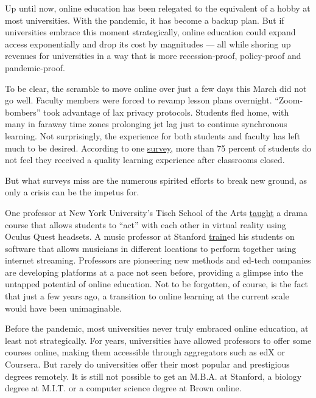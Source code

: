 Up until now, online education has been relegated to the equivalent of a
hobby at most universities. With the pandemic, it has become a backup
plan. But if universities embrace this moment strategically, online
education could expand access exponentially and drop its cost by
magnitudes --- all while shoring up revenues for universities in a way
that is more recession-proof, policy-proof and pandemic-proof.

To be clear, the scramble to move online over just a few days this March
did not go well. Faculty members were forced to revamp lesson plans
overnight. ``Zoom-bombers'' took advantage of lax privacy protocols.
Students fled home, with many in faraway time zones prolonging jet lag
just to continue synchronous learning. Not surprisingly, the experience
for both students and faculty has left much to be desired. According to
one
\href{https://oneclass.com/blog/featured/177356-7525-of-college-students-unhappy-with-quality-of-elearning-during-covid-19.en.html}{survey},
more than 75 percent of students do not feel they received a quality
learning experience after classrooms closed.

But what surveys miss are the numerous spirited efforts to break new
ground, as only a crisis can be the impetus for.

One professor at New York University's Tisch School of the Arts
\href{https://www.ny1.com/nyc/all-boroughs/coronavirus-blog/2020/05/06/nyu-vr-drama-classes}{taught}
a drama course that allows students to ``act'' with each other in
virtual reality using Oculus Quest headsets. A music professor at
Stanford
\href{https://news.stanford.edu/2020/04/06/stanford-faculty-students-connect-digital-classrooms/}{train}ed
his students on software that allows musicians in different locations to
perform together using internet streaming. Professors are pioneering new
methods and ed-tech companies are developing platforms at a pace not
seen before, providing a glimpse into the untapped potential of online
education. Not to be forgotten, of course, is the fact that just a few
years ago, a transition to online learning at the current scale would
have been unimaginable.

Before the pandemic, most universities never truly embraced online
education, at least not strategically. For years, universities have
allowed professors to offer some courses online, making them accessible
through aggregators such as edX or Coursera. But rarely do universities
offer their most popular and prestigious degrees remotely. It is still
not possible to get an M.B.A. at Stanford, a biology degree at M.I.T. or
a computer science degree at Brown online.

